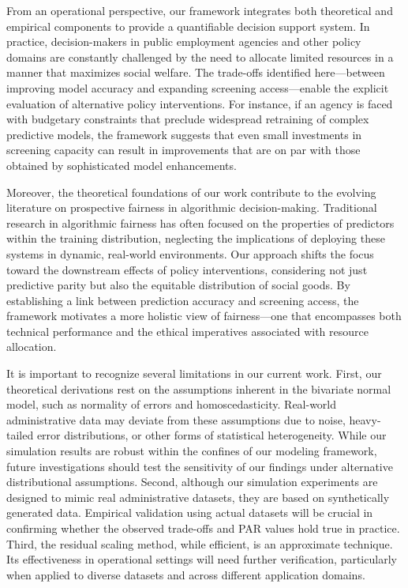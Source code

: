 \documentclass{article} %
\begin{document}
From an operational perspective, our framework integrates both theoretical and empirical components to provide a quantifiable decision support system. In practice, decision-makers in public employment agencies and other policy domains are constantly challenged by the need to allocate limited resources in a manner that maximizes social welfare. The trade-offs identified here—between improving model accuracy and expanding screening access—enable the explicit evaluation of alternative policy interventions. For instance, if an agency is faced with budgetary constraints that preclude widespread retraining of complex predictive models, the framework suggests that even small investments in screening capacity can result in improvements that are on par with those obtained by sophisticated model enhancements.

Moreover, the theoretical foundations of our work contribute to the evolving literature on prospective fairness in algorithmic decision-making. Traditional research in algorithmic fairness has often focused on the properties of predictors within the training distribution, neglecting the implications of deploying these systems in dynamic, real-world environments. Our approach shifts the focus toward the downstream effects of policy interventions, considering not just predictive parity but also the equitable distribution of social goods. By establishing a link between prediction accuracy and screening access, the framework motivates a more holistic view of fairness—one that encompasses both technical performance and the ethical imperatives associated with resource allocation.

It is important to recognize several limitations in our current work. First, our theoretical derivations rest on the assumptions inherent in the bivariate normal model, such as normality of errors and homoscedasticity. Real-world administrative data may deviate from these assumptions due to noise, heavy-tailed error distributions, or other forms of statistical heterogeneity. While our simulation results are robust within the confines of our modeling framework, future investigations should test the sensitivity of our findings under alternative distributional assumptions. Second, although our simulation experiments are designed to mimic real administrative datasets, they are based on synthetically generated data. Empirical validation using actual datasets will be crucial in confirming whether the observed trade-offs and PAR values hold true in practice. Third, the residual scaling method, while efficient, is an approximate technique. Its effectiveness in operational settings will need further verification, particularly when applied to diverse datasets and across different application domains.
\end{document}
